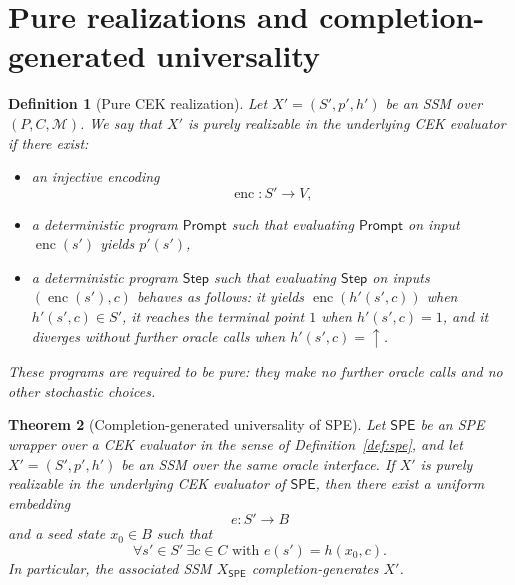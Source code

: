 \documentclass[11pt]{article}
\newtheorem{definition}{Definition}[section]
\newtheorem{theorem}[definition]{Theorem}
\newcommand{\SPE}{\mathsf{SPE}}
\newcommand{\enc}{\operatorname{enc}}
\begin{document}
\section{Pure realizations and completion-generated universality}

\begin{definition}[Pure CEK realization]
Let $X'=(S',p',h')$ be an SSM over $(P,C,\mathcal{M})$. We say that $X'$ is \emph{purely realizable in the underlying CEK evaluator} if there exist:
\begin{itemize}
    \item an injective encoding
    \[
    \enc:S'\to V,
    \]
    \item a deterministic program $\mathsf{Prompt}$ such that evaluating $\mathsf{Prompt}$ on input $\enc(s')$ yields $p'(s')$,
    \item a deterministic program $\mathsf{Step}$ such that evaluating $\mathsf{Step}$ on inputs $(\enc(s'),c)$ behaves as follows: it yields $\enc(h'(s',c))$ when $h'(s',c)\in S'$, it reaches the terminal point $1$ when $h'(s',c)=1$, and it diverges without further oracle calls when $h'(s',c)=\uparrow$.
\end{itemize}
These programs are required to be \emph{pure}: they make no further oracle calls and no other stochastic choices.
\end{definition}

\begin{theorem}[Completion-generated universality of SPE]\label{thm:main}
Let $\SPE$ be an SPE wrapper over a CEK evaluator in the sense of Definition~\ref{def:spe}, and let $X'=(S',p',h')$ be an SSM over the same oracle interface. If $X'$ is purely realizable in the underlying CEK evaluator of $\SPE$, then there exist a uniform embedding
\[
e:S'\to B
\]
and a seed state $x_0\in B$ such that
\[
\forall s'\in S'\ \exists c\in C\text{ with } e(s')=h(x_0,c).
\]
In particular, the associated SSM $X_{\SPE}$ completion-generates $X'$.
\end{theorem}
\end{document}
